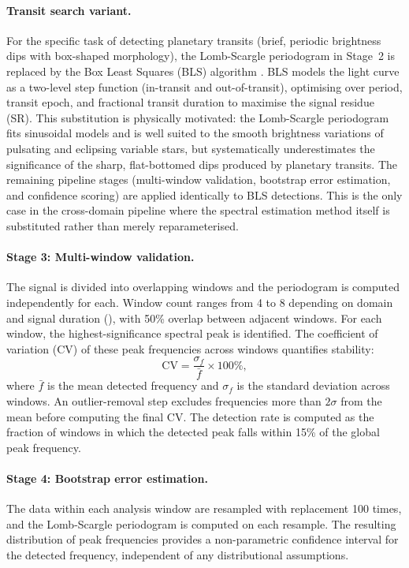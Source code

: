 \documentclass[11pt,a4paper]{article}
\newcommand{\CV}{\mathrm{CV}}
\begin{document}
\paragraph{Transit search variant.} For the specific task of detecting planetary transits (brief, periodic brightness dips with box-shaped morphology), the Lomb-Scargle periodogram in Stage~2 is replaced by the Box Least Squares (BLS) algorithm \citep{Kovacs2002}. BLS models the light curve as a two-level step function (in-transit and out-of-transit), optimising over period, transit epoch, and fractional transit duration to maximise the signal residue (SR). This substitution is physically motivated: the Lomb-Scargle periodogram fits sinusoidal models and is well suited to the smooth brightness variations of pulsating and eclipsing variable stars, but systematically underestimates the significance of the sharp, flat-bottomed dips produced by planetary transits. The remaining pipeline stages (multi-window validation, bootstrap error estimation, and confidence scoring) are applied identically to BLS detections. This is the only case in the cross-domain pipeline where the spectral estimation method itself is substituted rather than merely reparameterised.

\paragraph{Stage 3: Multi-window validation.} The signal is divided into overlapping windows and the periodogram is computed independently for each. Window count ranges from 4 to 8 depending on domain and signal duration (), with 50\% overlap between adjacent windows. For each window, the highest-significance spectral peak is identified. The coefficient of variation (CV) of these peak frequencies across windows quantifies stability:
\begin{equation}
  \CV = \frac{\sigma_f}{\bar{f}} \times 100\%,
  \label{eq:cv}
\end{equation}
where $\bar{f}$ is the mean detected frequency and $\sigma_f$ is the standard deviation across windows. An outlier-removal step excludes frequencies more than $2\sigma$ from the mean before computing the final CV. The detection rate is computed as the fraction of windows in which the detected peak falls within 15\% of the global peak frequency.

\paragraph{Stage 4: Bootstrap error estimation.} The data within each analysis window are resampled with replacement 100 times, and the Lomb-Scargle periodogram is computed on each resample. The resulting distribution of peak frequencies provides a non-parametric confidence interval for the detected frequency, independent of any distributional assumptions.
\end{document}
